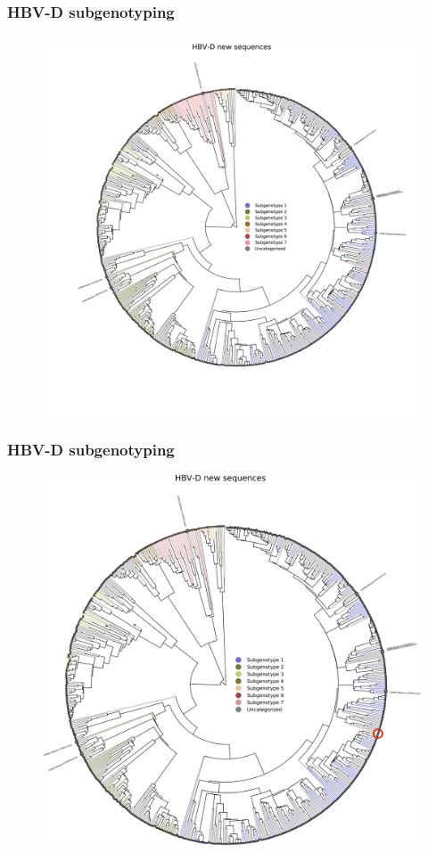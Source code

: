 \documentclass{beamer}
\begin{document}

\begin{frame}
  \frametitle{HBV-D subgenotyping}
  \begin{figure}
    \includegraphics[width=.6\linewidth]{image/results/HBV-D_new_sequences}
  \end{figure}
\end{frame}


\begin{frame}
  \frametitle{HBV-D subgenotyping}
  \begin{figure}
    \includegraphics[width=.6\linewidth]{image/results/HBV-D_new_sequences_with_highlights.png}
  \end{figure}
\end{frame}

\end{document}
